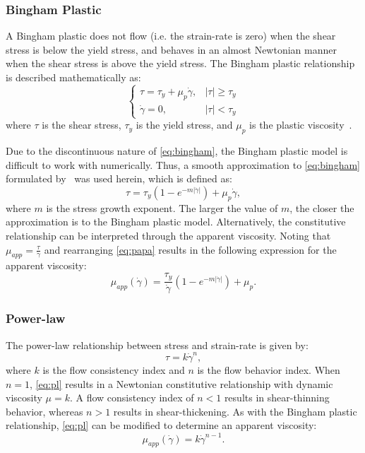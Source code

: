 \subsubsection{Bingham Plastic} \label{sec:bp}

A Bingham plastic does not flow (i.e. the strain-rate is zero) when the shear stress is below the yield stress, and behaves in an almost Newtonian manner when the shear stress is above the yield stress.
The Bingham plastic relationship is described mathematically as:
\begin{equation} \label{eq:bingham}
\begin{cases}
\tau = \tau_y + \mu_p \dot{\gamma}, & |\tau| \geq \tau_y \\
\dot{\gamma} = 0, & |\tau| < \tau_y
\end{cases}
\end{equation}
\noindent where $\tau$ is the shear stress, $\tau_y$ is the yield stress, and $\mu_p$ is the plastic viscosity~\cite{bingham1922fluidity}.

Due to the discontinuous nature of \eqref{eq:bingham}, the Bingham plastic model is difficult to work with numerically.
Thus, a smooth approximation to \eqref{eq:bingham} formulated by~\citet{papanastasiou1987flows} was used herein, which is defined as:
\begin{equation} \label{eq:papa}
\tau = \tau_y (1 - e^{-m |\dot{\gamma}|}) + \mu_p \dot{\gamma},
\end{equation}
\noindent where $m$ is the stress growth exponent.
The larger the value of $m$, the closer the approximation is to the Bingham plastic model.
Alternatively, the constitutive relationship can be interpreted through the apparent viscosity.
Noting that $\mu_{app} = \frac{\tau}{\dot{\gamma}}$ and rearranging \eqref{eq:papa} results in the following expression for the apparent viscosity:
\begin{equation} \label{eq:bing-mu-app}
  \mu_{app}(\dot{\gamma}) = \frac{\tau_y}{\dot{\gamma}} (1 - e^{-m |\dot{\gamma}|}) + \mu_p.
\end{equation}

\subsubsection{Power-law}

The power-law relationship between stress and strain-rate is given by:
\begin{equation} \label{eq:pl}
\tau = k \dot{\gamma}^n,
\end{equation}
\noindent where $k$ is the flow consistency index and $n$ is the flow behavior index.
When $n = 1$, \eqref{eq:pl} results in a Newtonian constitutive relationship with dynamic viscosity $\mu = k$.
A flow consistency index of $n < 1$ results in shear-thinning behavior, whereas $n > 1$ results in shear-thickening.
As with the Bingham plastic relationship, \eqref{eq:pl} can be modified to determine an apparent viscosity:
\begin{equation} \label{eq:pl-mu-app}
  \mu_{app}(\dot{\gamma}) = k \dot{\gamma}^{n-1}.
\end{equation}

